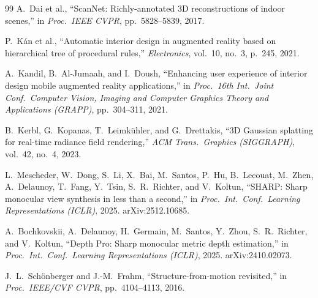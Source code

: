 \begin{thebibliography}{99}
A.~Dai et al., ``ScanNet: Richly-annotated 3D reconstructions of indoor scenes,'' in \textit{Proc.~IEEE CVPR}, pp.~5828--5839, 2017.

P.~K\'an et al., ``Automatic interior design in augmented reality based on hierarchical tree of procedural rules,'' \textit{Electronics}, vol.~10, no.~3, p.~245, 2021.

A.~Kandil, B.~Al-Jumaah, and I.~Doush, ``Enhancing user experience of interior design mobile augmented reality applications,'' in \textit{Proc.~16th Int.~Joint Conf.~Computer Vision, Imaging and Computer Graphics Theory and Applications (GRAPP)}, pp.~304--311, 2021.

B.~Kerbl, G.~Kopanas, T.~Leimk\"uhler, and G.~Drettakis, ``3D Gaussian splatting for real-time radiance field rendering,'' \textit{ACM Trans.~Graphics (SIGGRAPH)}, vol.~42, no.~4, 2023.

L.~Mescheder, W.~Dong, S.~Li, X.~Bai, M.~Santos, P.~Hu, B.~Lecouat, M.~Zhen, A.~Delaunoy, T.~Fang, Y.~Tsin, S.~R.~Richter, and V.~Koltun, ``SHARP: Sharp monocular view synthesis in less than a second,'' in \textit{Proc.~Int.~Conf.~Learning Representations (ICLR)}, 2025. arXiv:2512.10685.

A.~Bochkovskii, A.~Delaunoy, H.~Germain, M.~Santos, Y.~Zhou, S.~R.~Richter, and V.~Koltun, ``Depth Pro: Sharp monocular metric depth estimation,'' in \textit{Proc.~Int.~Conf.~Learning Representations (ICLR)}, 2025. arXiv:2410.02073.

J.~L.~Sch{\"o}nberger and J.-M.~Frahm, ``Structure-from-motion revisited,'' in \textit{Proc.~IEEE/CVF CVPR}, pp.~4104--4113, 2016.

\end{thebibliography}
